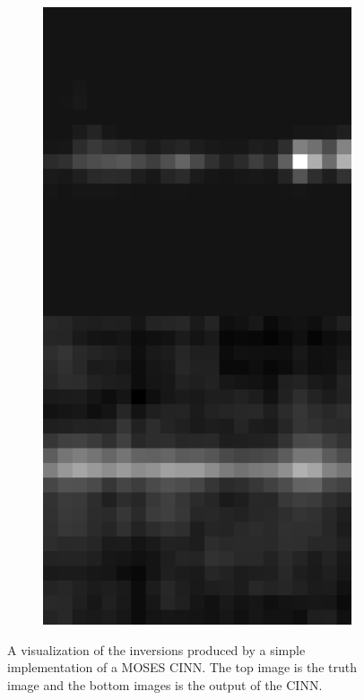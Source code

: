 \documentclass[10pt, letter]{article}
\begin{document}
\begin{figure}[h!]
\begin{subfigure}[t]{0.1\textwidth}
					\includegraphics[width=\textwidth]{figures/inv5}
				\end{subfigure}	
				\caption{A visualization of the inversions produced by a simple implementation of a MOSES CINN. The top image is the truth image and the bottom images is the output of the CINN.}
			\end{figure}	
			
\end{document}
